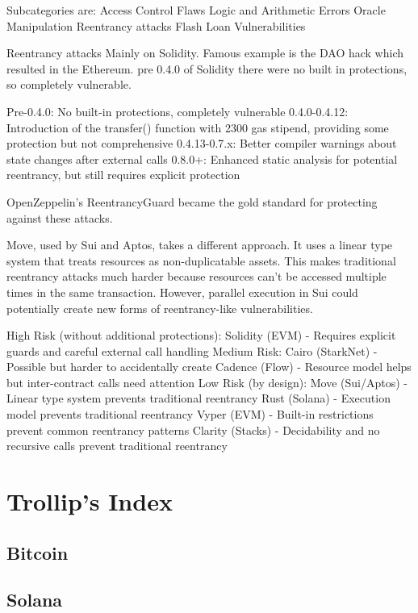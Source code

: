 \documentclass[
  letterpaper,
  DIV=11,
  numbers=noendperiod]{scrreprt}
\begin{document}
Subcategories are: Access Control Flaws Logic and Arithmetic Errors
Oracle Manipulation Reentrancy attacks Flash Loan Vulnerabilities

Reentrancy attacks Mainly on Solidity. Famous example is the DAO hack
which resulted in the Ethereum. pre 0.4.0 of Solidity there were no
built in protections, so completely vulnerable.

Pre-0.4.0: No built-in protections, completely vulnerable 0.4.0-0.4.12:
Introduction of the transfer() function with 2300 gas stipend, providing
some protection but not comprehensive 0.4.13-0.7.x: Better compiler
warnings about state changes after external calls 0.8.0+: Enhanced
static analysis for potential reentrancy, but still requires explicit
protection

OpenZeppelin's ReentrancyGuard became the gold standard for protecting
against these attacks.

Move, used by Sui and Aptos, takes a different approach. It uses a
linear type system that treats resources as non-duplicatable assets.
This makes traditional reentrancy attacks much harder because resources
can't be accessed multiple times in the same transaction. However,
parallel execution in Sui could potentially create new forms of
reentrancy-like vulnerabilities.

High Risk (without additional protections): Solidity (EVM) - Requires
explicit guards and careful external call handling Medium Risk: Cairo
(StarkNet) - Possible but harder to accidentally create Cadence (Flow) -
Resource model helps but inter-contract calls need attention Low Risk
(by design): Move (Sui/Aptos) - Linear type system prevents traditional
reentrancy Rust (Solana) - Execution model prevents traditional
reentrancy Vyper (EVM) - Built-in restrictions prevent common reentrancy
patterns Clarity (Stacks) - Decidability and no recursive calls prevent
traditional reentrancy

\chapter{Trollip's Index}\label{trollips-index}

\section{Bitcoin}\label{bitcoin}

\section{Solana}\label{solana}
\end{document}
